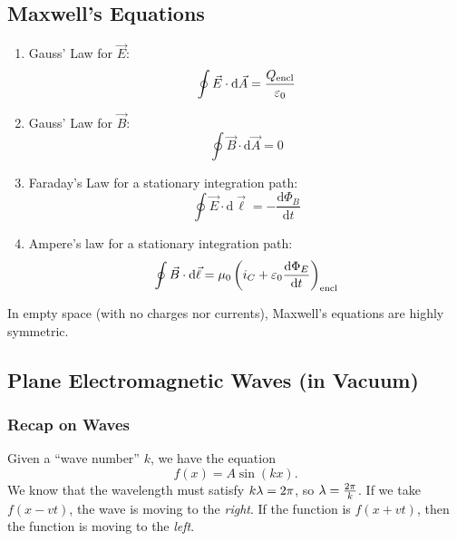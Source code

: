 \documentclass[class=article, crop=false]{standalone}
\begin{document}
  \subsection{Maxwell's Equations}
  \begin{enumerate}
    \item Gauss' Law for $\vec{E}$:
    \[
      \oint \vec{E}\cdot \mathrm{d}\vec{A} = \frac{Q_\text{encl}}{\varepsilon_0}
    \]
    \item Gauss' Law for $\vec{B}$:
    \[
      \oint \vec{B}\cdot \mathrm{d}\vec{A} = 0
    \]
    \item Faraday's Law for a stationary integration path:
    \[
      \oint \vec{E}\cdot \mathrm{d}\vec{\ell} = -\frac{\mathrm{d}\Phi_B}{\mathrm{d}t}
    \]
    \item Ampere's law for a stationary integration path:
    \[
      \oint \vec{B}\cdot \mathrm{d}\vec{\ell} = \mu_0\left( i_C + \varepsilon_0 \frac{\mathrm{d}\Phi_E}{\mathrm{d}t} \right)_\text{encl}
    \]
  \end{enumerate}
  \begin{note}{}
    In empty space (with no charges nor currents), Maxwell's equations are highly symmetric.
  \end{note}
  \subsection{Plane Electromagnetic Waves (in Vacuum)}
  \subsubsection{Recap on Waves}
  Given a ``wave number'' $k$, we have the equation
  \[
    f(x) = A\sin (kx).
  \]
  We know that the wavelength must satisfy $k\lambda = 2\pi$, so $\lambda = \frac{2\pi}{k}$. If we take $f(x - vt)$, the wave is moving to the \emph{right}. If the function is $f(x + vt)$, then the function is moving to the \emph{left}.
\end{document}
